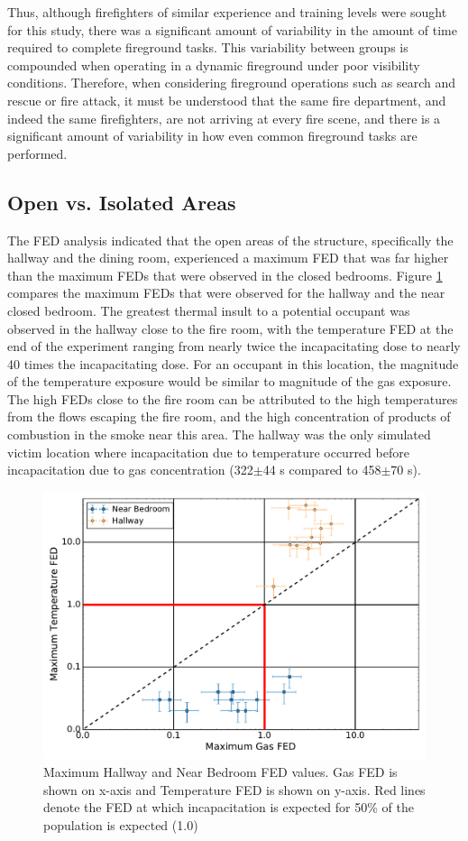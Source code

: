 \documentclass[12pt,oneside]{article}
\begin{document}
Thus, although firefighters of similar experience and training levels were sought for this study, there was a significant amount of variability in the amount of time required to complete fireground tasks. This variability between groups is compounded when operating in a dynamic fireground under poor visibility conditions. Therefore, when considering fireground operations such as search and rescue or fire attack, it must be understood that the same fire department, and indeed the same firefighters, are not arriving at every fire scene, and there is a significant amount of variability in how even common fireground tasks are performed. 

\subsection{Open vs. Isolated Areas}
\label{subsec:open_v_iso}

The FED analysis indicated that the open areas of the structure, specifically the hallway and the dining room, experienced a maximum FED that was far higher than the maximum FEDs that were observed in the closed bedrooms. Figure \ref{fig:near_FED_compare} compares the maximum FEDs that were observed for the hallway and the near closed bedroom. The greatest thermal insult to a potential occupant was observed in the hallway close to the fire room, with the temperature FED at the end of the experiment ranging from nearly twice the incapacitating dose to nearly 40 times the incapacitating dose. For an occupant in this location, the magnitude of the temperature exposure would be similar to magnitude of the gas exposure. The high FEDs close to the fire room can be attributed to the high temperatures from the flows escaping the fire room, and the high concentration of products of combustion in the smoke near this area. The hallway was the only simulated victim location where incapacitation due to temperature occurred before incapacitation due to gas concentration (322$\pm$44 s compared to 458$\pm$70 s).
\begin{figure}[!ht]	
	\centering
	\includegraphics[width=.75\textwidth]{../Figures/br_compare/Near}
	\caption[Maximum Hallway and Near Bedroom FED values]{Maximum Hallway and Near Bedroom FED values. Gas FED is shown on x-axis and Temperature FED is shown on y-axis. Red lines denote the FED at which incapacitation is expected for 50\% of the population is expected (1.0)}
	\label{fig:near_FED_compare}
\end{figure}
\end{document}
